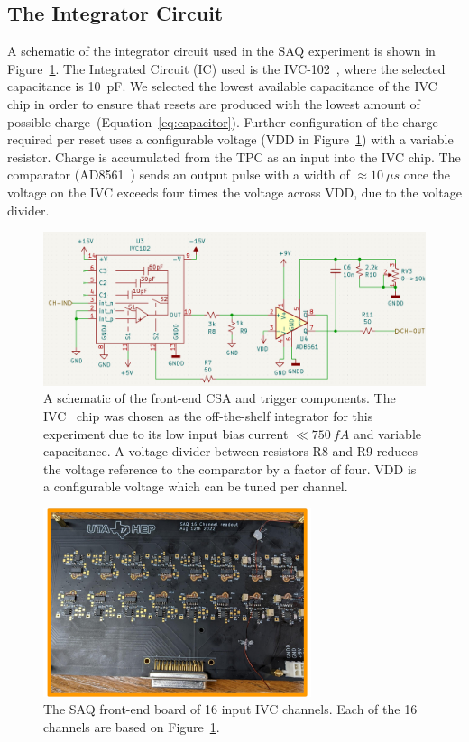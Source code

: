 \subsection{The Integrator Circuit}
\label{sec:saq_integrator}
A schematic of the integrator circuit used in the SAQ experiment is shown in Figure~\ref{fig:saq_circuit_kicad}.
The Integrated Circuit (IC) used is the IVC-102~\citep{ivc_datasheet}, where the selected capacitance is 10~\unit{pF}.
We selected the lowest available capacitance of the IVC chip in order to ensure that resets are produced with the lowest amount of possible charge~(Equation~\ref{eq:capacitor}).
Further configuration of the charge required per reset uses a configurable voltage (VDD in Figure~\ref{fig:saq_circuit_kicad}) with a variable resistor.
Charge is accumulated from the TPC as an input into the IVC chip.
The comparator (AD8561~\citep{AD8561-datasheet}) sends an output pulse with a width of $\approx 10~\unit{\mu s}$ once the voltage on the IVC exceeds four times the voltage across VDD, due to the voltage divider.

\begin{figure}[]
\centering
\includegraphics[width=\textwidth]{images/saq_integrator_circuit.png}
\caption{
A schematic of the front-end CSA and trigger components.
The IVC~\citep{ivc_datasheet} chip was chosen as the off-the-shelf integrator for this experiment due to its low input bias current $\ll 750~\unit{fA}$ and variable capacitance.
A voltage divider between resistors R8 and R9 reduces the voltage reference to the comparator by a factor of four.
VDD is a configurable voltage which can be tuned per channel.
}
\label{fig:saq_circuit_kicad}
\end{figure}

\begin{figure}[]
\centering
\includegraphics[width=0.7\textwidth]{images/SAQ_16_ivc_readout_board.pdf}
\caption{The SAQ front-end board of 16 input IVC channels.
Each of the 16 channels are based on Figure~\ref{fig:saq_circuit_kicad}.
}
\label{fig:saq_readout_board}
\end{figure}

